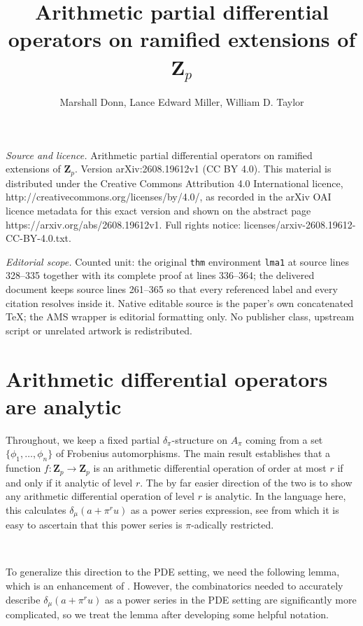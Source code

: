 \documentclass[10pt,a4paper]{amsart}
\newcommand{\ZZ}{\mathbf Z}
\renewcommand{\d}{\delta}
\begin{document}
\title[Arithmetic partial differential operators on ramified extens]{Arithmetic partial differential operators on ramified extensions of $\ZZ_p$}
\author{Marshall Donn, Lance Edward Miller, William D. Taylor}
\date{}
\maketitle
\noindent\emph{Source and licence.} Arithmetic partial differential operators on ramified extensions of $\ZZ_p$. Version arXiv:2608.19612v1 (CC BY 4.0). This material is distributed under the Creative Commons Attribution 4.0 International licence, http://creativecommons.org/licenses/by/4.0/, as recorded in the arXiv OAI licence metadata for this exact version and shown on the abstract page https://arxiv.org/abs/2608.19612v1. Full rights notice: licenses/arxiv-2608.19612-CC-BY-4.0.txt.\par\smallskip
\noindent\textit{Editorial scope.} Counted unit: the original \texttt{thm} environment \texttt{lma1} at source lines 328--335 together with its complete proof at lines 336--364; the delivered document keeps source lines 261--365 so that every referenced label and every citation resolves inside it. Native editable source is the paper's own concatenated TeX; the AMS wrapper is editorial formatting only. No publisher class, upstream script or unrelated artwork is redistributed.
\section{Arithmetic differential operators are analytic} Throughout, we keep a fixed partial $\delta_{\pi}$-structure on $A_\pi$ coming from a set $\{ \phi_1,\ldots,\phi_n\}$ of Frobenius automorphisms. The main result \cite[Thm. 4, 5]{BRS11} establishes that a function $f \colon \ZZ_p \to \ZZ_p$ is an arithmetic differential operation of order at most $r$ if and only if it analytic of level $r$. The by far easier direction of the two is to show any arithmetic differential operation of level $r$ is analytic. In the language here, this calculates $\d_\mu(a+\pi^r u)$ as a power series expression, see \cite[Lem. 10]{BRS11} from which it is easy to ascertain that this power series is $\pi$-adically restricted. 

\

To generalize this direction to the PDE setting, we need the following lemma, which is an enhancement of \cite[Lem. 10]{BRS11}. However, the combinatorics needed to accurately describe $\d_\mu(a + \pi^r u)$ as a power series in the PDE setting are significantly more complicated, so we treat the lemma after developing some helpful notation. 
\end{document}
